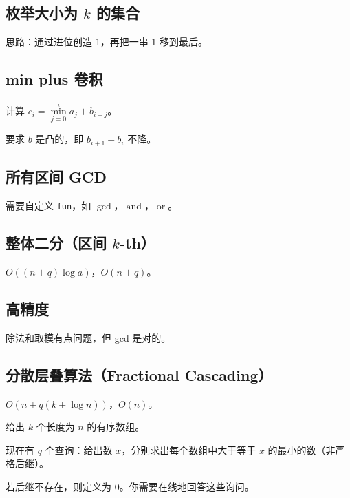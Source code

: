 \documentclass[12pt]{ctexart}
\begin{document}
\subsection{枚举大小为 $k$ 的集合}

思路：通过进位创造 $1$，再把一串 $1$ 移到最后。


\subsection{min plus 卷积}

计算 $c_i=\min\limits_{j=0}^i a_j+b_{i-j}$。

要求 $b$ 是凸的，即 $b_{i+1}-b_i$ 不降。



\subsection{所有区间 GCD}

需要自定义 \verb|fun|，如 $\gcd$，$\operatorname{and}$，$\operatorname{or}$。


\subsection{整体二分（区间 $k$-th）}

$O((n+q)\log a)$，$O(n+q)$。



\subsection{高精度}

除法和取模有点问题，但 gcd 是对的。



\subsection{分散层叠算法（Fractional Cascading）}

$O(n+q(k+\log n))$，$O(n)$。

给出 $k$ 个长度为 $n$ 的有序数组。

现在有 $q$ 个查询：给出数 $x$，分别求出每个数组中大于等于 $x$ 的最小的数（非严格后继）。

若后继不存在，则定义为 $0$。你需要在线地回答这些询问。
\end{document}
